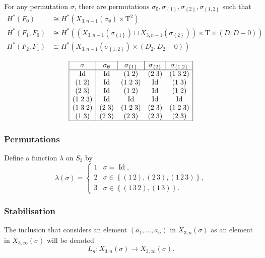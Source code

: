 \documentclass{beamer} %
\DeclareMathOperator{\Id}{Id}
\newcommand{\T}{\mathrm{T}}
\newcommand{\set}[1]{\left\{ #1 \right\}}
\renewcommand{\l}{\lambda}
\begin{document}
\begin{frame}
  \begin{theorem}
    For any permutation $\sigma$, there are permutations
    $\sigma_{\emptyset},\sigma_{\set{1}},\sigma_{\set{2}},\sigma_{\set{1,2}}$
    such that
    \begin{align*}
      H^*(F_0) &\cong H^*(X_{3,n-1}(\sigma_{\emptyset})\times\T^2) \\
      H^*(F_1,F_0) &\cong H^*((X_{3,n-1}(\sigma_{\set{1}})\sqcup
                     X_{3,n-1}(\sigma_{\set{2}}))\times \T\times
                     (D,D-0)) \\
      H^*(F_2,F_1) &\cong
                     H^*(X_{3,n-1}(\sigma_{\set{1,2}})\times(D_2,D_2-0))
    \end{align*}
  \end{theorem} \pause
  \[
  \begin{array}{|c|cccc|}
    \hline
    \sigma & \multicolumn{1}{c|}{\sigma_\emptyset}
    & \multicolumn{1}{c|}{\sigma_{\set{1}}}
    & \multicolumn{1}{c|}{\sigma_{\set{2}}} & \sigma_{\set{1,2}} \\
    \hline
    \Id & \Id & (1\;2) & (2\;3) & (1\;3\;2) \\
    (1\;2) & \Id & (1\;2\;3) & \Id & (1\;3) \\
    (2\;3) & \Id & (1\;2) & \Id & (1\;2) \\
    (1\;2\;3) & \Id & \Id & \Id & \Id \\
    (1\;3\;2) & (2\;3) & (1\;2\;3) & (2\;3) & (1\;2\;3) \\
    (1\;3) & (2\; 3) & (2\;3) & (2\;3) & (2\;3) \\
    \hline
  \end{array}
  \]
\end{frame}

\begin{frame}
  \frametitle{Permutations}
  \begin{definition}
    Define a function $\l$ on $S_3$ by
    \[ \l(\sigma) =
    \begin{cases}
      1 & \sigma = \Id, \\
      2 & \sigma \in \set{(1\,2),(2\,3),(1\,2\,3)}, \\
      3 & \sigma \in \set{(1\,3\,2), (1\,3)}.
    \end{cases} \]
  \end{definition}
\end{frame}

\begin{frame}
  \frametitle{Stabilisation}
  \begin{definition}
    The inclusion that considers an element $(a_1,\dots,a_n)$ in
    $X_{3,n}(\sigma)$ as an element in $X_{3,\infty}(\sigma)$ will be
    denoted
    \[ L_n : X_{3,n}(\sigma) \to X_{3,\infty}(\sigma). \]
  \end{definition}
\end{frame}
\end{document}
